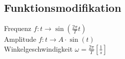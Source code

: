 \subsection{Funktionsmodifikation}
    Frequenz $f: t \rightarrow \sin(\frac{2 \pi}{T} t)$\\
    Amplitude $f: t \rightarrow A \cdot \sin(t)$\\
    Winkelgeschwindigkeit $\omega = \frac{2 \pi}{T} \left[\frac{1}{s}\right]$